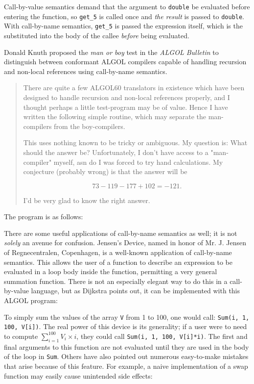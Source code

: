 Call-by-value semantics demand that the argument to \texttt{double} be evaluated
before entering the function, so \texttt{get\_5} is called once and
\textit{the result} is passed to \texttt{double}.
With call-by-name semantics, \texttt{get\_5} is passed the expression itself,
which is the substituted into the body of the callee \textit{before}
being evaluated.

Donald Knuth proposed the \textit{man or boy} test in the \textit{ALGOL Bulletin}
to distinguish between
conformant ALGOL compilers capable of handling recursion and non-local references
using call-by-name semantics\cite{Knuth1964ManOrBoy}.

\begin{quotation}
	There are quite a few ALGOL60 translators in existence which have been designed
	to handle recursion and non-local references properly, and I thought perhaps a
	little test-program may be of value. Hence I have written the following simple
	routine, which may separate the man-compilers from the boy-compilers.

	This uses nothing known to be tricky or ambiguous. My question is: What should
	the answer be? Unfortunately, I don't have access to a "man-compiler" myself,
	asn do I was forced to try hand calculations. My conjecture (probably wrong) is
	that the answer will be

	\[
		73 - 119 - 177 + 102 = -121 .
	\]

	I'd be very glad to know the right answer.
\end{quotation}

The program is as follows:



There are some useful applications of call-by-name semantics as well;
it is not \textit{solely} an avenue for confusion.
Jensen's Device, named in honor of Mr. J. Jensen of Regnecentralen, Copenhagen,
is a well-known application of call-by-name semantics.
This allows the user of a function to describe an expression to be evaluated
in a loop body inside the function, permitting a very general summation function.
There is not an especially elegant way to do this in a call-by-value language,
but as Dijkstra points out\cite{dijkstra_defense_of_algol_60_1961},
it can be implemented with this ALGOL program:



To simply sum the values of the array \texttt{V} from 1 to 100, one would call:
\texttt{Sum(i, 1, 100, V[i])}.
The real power of this device is its generality;
if a user were to need to compute $\sum_{i=1}^{100} V_{i}\times i$,
they could call \texttt{Sum(i, 1, 100, V[i]*i)}.
The first and final arguments to this function are not evaluated
until they are used in the body of the loop in \texttt{Sum}.
Others have also pointed out numerous easy-to-make mistakes
that arise because of this feature.
For example, a naive implementation of a swap function may easily
cause unintended side effects:

